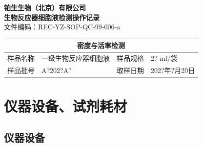 \documentclass[UTF8,10pt,a4paper,fontset=fandol]{ctexart}
\newcommand{\fieldvalue}[1]{#1}
\newcommand{\handwritten}[1]{#1}
\begin{document}

\newpage

\begin{center}
\textbf{铂生生物（北京）有限公司}\\
\textbf{生物反应器细胞液检测操作记录}\\
文件编码：REC-YZ-SOP-QC-99-006-a
\end{center}

\begin{center}
\begin{tabular}{|p{2.2cm}|p{5.0cm}|p{2.2cm}|p{3.2cm}|}
\hline
\multicolumn{4}{|c|}{密度与活率检测}\\
\hline
样品名称 &
\fieldvalue{\handwritten{一级生物反应器细胞液}} &
样品规格 &
\fieldvalue{\handwritten{2? ml/袋}}\\
\hline
样品批号 &
\fieldvalue{\handwritten{A?202?A?}} &
取样日期 &
\fieldvalue{\handwritten{202?年?月20日}}\\
\hline
\end{tabular}
\end{center}

\section{仪器设备、试剂耗材}

\subsection{仪器设备}
\end{document}
